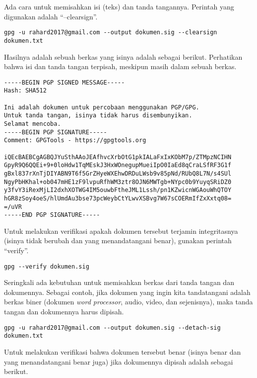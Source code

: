 Ada cara untuk memisahkan isi (teks) dan tanda tangannya. Perintah yang
digunakan adalah ``--clearsign''.
\begin{verbatim}
gpg -u rahard2017@gmail.com --output dokumen.sig --clearsign dokumen.txt
\end{verbatim}

Hasilnya adalah sebuah berkas yang isinya adalah sebagai berikut. Perhatikan
bahwa isi dan tanda tangan terpisah, meskipun masih dalam sebuah berkas.

\begin{mdframed}[backgroundcolor=red!20]
\begin{verbatim}
-----BEGIN PGP SIGNED MESSAGE-----
Hash: SHA512

Ini adalah dokumen untuk percobaan menggunakan PGP/GPG.
Untuk tanda tangan, isinya tidak harus disembunyikan.
Selamat mencoba.
-----BEGIN PGP SIGNATURE-----
Comment: GPGTools - https://gpgtools.org

iQEcBAEBCgAGBQJYuSthAAoJEAfhvcXrbOtG1pkIALaFxIxKObM7p/ZTMpzNCIHN
GpyR9Q6QQEi+9+0loHdw1TqMEskJ3HxWOnegupMueiIpO0IaEd8qCraLSfRF3G1f
gBxl837rXnTjDIYABN9T6f5GrZHyeWXEhwDRDuLWsb9v85pNd/RUbQ8L7N/s4SUl
NgyPbHKhal+ob047mHE1zF9lvpuRfhWM3ztr8OJN6MWTgb+NYpc0b9YuyqSRiDZ0
y3fvY3iRexMjLI2dxhXOTWG4IM5ouwbFtheJML1Lssh/pn1KZwicnWGAouWhQTOY
hGR8zSoy4oeS/hlUmdAu3bse73pcWeybCtYLwvXSBvg7W67sCOERmIfZxXxtq08=
=/uVR
-----END PGP SIGNATURE-----
\end{verbatim}
\end{mdframed}

Untuk melakukan verifikasi apakah dokumen tersebut terjamin integritasnya
(isinya tidak berubah dan yang menandatangani benar), gunakan perintah
``verify''.

\begin{mdframed}
\begin{verbatim}
gpg --verify dokumen.sig
\end{verbatim}
\end{mdframed}


Seringkali ada kebutuhan untuk memisahkan berkas dari tanda tangan dan
dokumennya. Sebagai contoh, jika dokumen yang ingin kita tandatangani adalah berkas
biner (dokumen {\em word processor}, audio, video, dan sejenisnya), maka tanda
tangan dan dokumennya harus dipisah.

\begin{verbatim}
gpg -u rahard2017@gmail.com --output dokumen.sig --detach-sig dokumen.txt
\end{verbatim}

Untuk melakukan verifikasi bahwa dokumen tersebut benar (isinya benar dan yang
menandatangani benar juga) jika dokumennya dipisah adalah sebagai berikut.

